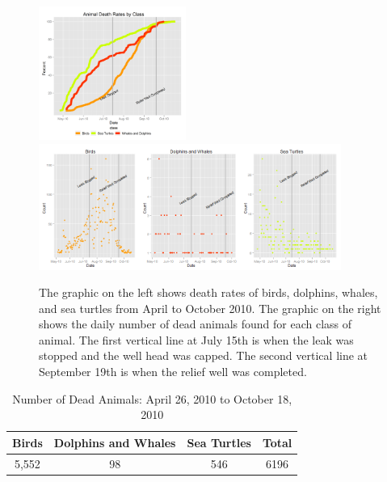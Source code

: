 \documentclass[authoryear,12pt]{elsarticle}
\begin{document}
\begin{figure}[htbp] %
   \centering
   \includegraphics[width=1.9in]{death-rates.png} 
    \includegraphics[width=3.9in]{daily-death-counts.png}
   \caption{The graphic on the left shows death rates of birds, dolphins, whales, and sea turtles from April to October 2010. The graphic on the right shows the daily number of dead animals found for each class of animal. The first vertical line at July 15th is when the leak was stopped and the well head was capped.  The second vertical line at September 19th is when the relief well was completed.}
   \label{death rates}
\end{figure}

\begin{table}[ht]
\caption{Number of Dead Animals: April 26, 2010 to October 18, 2010}
\centering
\begin{tabular}{c c c c}
\hline\hline
Birds & Dolphins and Whales & Sea Turtles & Total \\ [0.5ex]
\hline
5,552 & 98 & 546 & 6196\\ [1ex]
\hline
\end{tabular}
\label{table:table1}
\end{table}
\end{document}
